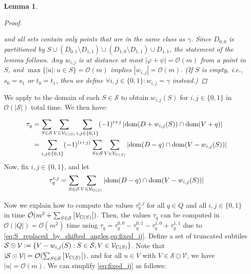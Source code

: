 \documentclass[11pt, letterpaper]{article}
\theoremstyle{plain}
\newtheorem{lemma}{Lemma}
\theoremstyle{definition}
\theoremstyle{remark}
\renewcommand{\O}{\mathcal{O}}
\newcommand{\tO}{\tilde{\mathcal{O}}}
\renewcommand{\S}{\mathcal{S}}
\newcommand{\V}{\mathcal{V}}
\renewcommand{\phi}{\varphi}
\newcommand{\absolute}[1]{\left\lvert#1\right\rvert}
\begin{document}
\begin{lemma}
\begin{proof}
\begin{itemize}
\begin{tikzpicture}[overlay, x=.6em, y=.6em]
\end{tikzpicture}
\end{itemize}
and all sets contain only points that are in the same class as $\gamma$. 
Since $D_{0,0}$ is partitioned by $S \cup (D_{0, 1}\setminus D_{1, 1}) \cup (D_{1, 0}\setminus D_{1, 1}) \cup D_{1, 1}$, the statement of the lemma follows. 
Any $w_{i, j}$ is at distance at most $\absolute{\phi + \psi} = \O(m)$ from a point in $S$, and $\max \{\absolute{u} : u \in S\} = \O(m)$ implies $\absolute{w_{i,j}} = \O(m)$. 
(If $S$ is empty, i.e., $s_0 = s_1$ or $t_0 = t_1$, then we define $\forall i,j\in\{0, 1\} : w_{i,j} = \gamma$ instead.)
\end{proof}

\end{lemma}


We apply  to the domain of each $S\in \S$ to obtain $w_{i, j}(S)$ for $i,j \in \{0,1\}$ in $\O(\absolute{\S})$ total time. We then have:

\begin{align}
\label{eq:S_replaced_by_shifted_angles}
\begin{split}
\tau_q &= \sum_{S \in \S} \sum_{V \in \V_{\getchar{S}}} \sum_{i,j \in \{0,1\}} (-1)^{i+j} \absolute{\d{D+w_{i, j}(S)} \cap \d{V + q}} \\
& = \sum_{i,j \in \{0,1\}} (-1)^{(i+j)} \sum_{S \in \S} \sum_{V \in \V_{\getchar{S}}} \absolute{\d{D-q} \cap \d{V-w_{i, j}(S)}}
\end{split}
\end{align}
%
Now, fix $i,j \in \{0,1\}$, and let 
%
\begin{equation}
\label{eq:fixed_ij}
\tau_q^{i,j} = \sum_{S \in \S} \sum_{V \in \V_{\getchar{S}}} \absolute{\d{D-q} \cap \d{V-w_{i, j}(S)}}
\end{equation}

Now we explain how to compute the values $\tau_q^{i,j}$ for all $q \in Q$ and all $i,j \in \{0,1\}$ in time $\tO(m^2 + \sum_{S \in \S} \absolute{\V_{\getchar{S}}})$. Then, the values $\tau_q$ can be computed in $\O(\absolute{Q}) = \O(m^2)$ time using $\tau_q = \tau^{0,0}_q - \tau^{0,1}_q - \tau^{1,0}_q + \tau^{1,1}_q$ due to \cref{eq:S_replaced_by_shifted_angles,eq:fixed_ij}. 
Define a set of truncated subtiles $\S \odot \V := \{V-w_{i, j}(S) : S \in \S, V \in \V_{\getchar{S}}\}$.  Note that $\absolute{\S \odot \V} = \O(\sum_{S \in \S} \absolute{\V_{\getchar{S}}})$, and for all $u \in V$ with $V \in \S \odot \V$, we have $\absolute{u} = \O(m)$. We can simplify \cref{eq:fixed_ij} as follows:
\end{document}
